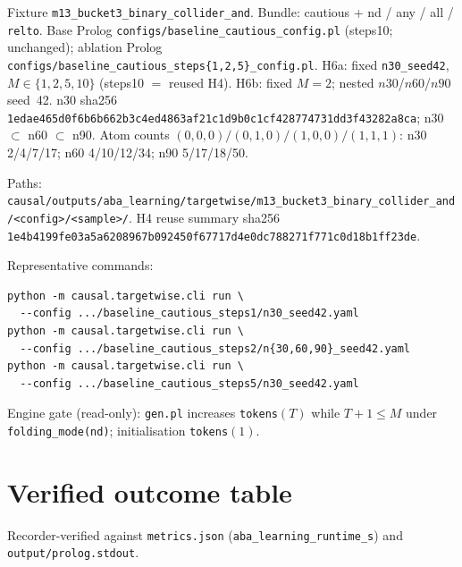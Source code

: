 \documentclass[11pt]{article}
\begin{document}
Fixture \texttt{m13\_bucket3\_binary\_collider\_and}.
Bundle: cautious + nd / any / all / \texttt{relto}.
Base Prolog \texttt{configs/baseline\_cautious\_config.pl} (steps10; unchanged);
ablation Prolog
\texttt{configs/baseline\_cautious\_steps\{1,2,5\}\_config.pl}.
H6a: fixed \texttt{n30\_seed42}, $M\in\{1,2,5,10\}$ (steps10 ${=}{}$ reused H4).
H6b: fixed $M{=}2$; nested $n30$/$n60$/$n90$ seed~42.
n30 sha256
\texttt{1edae465d0f6b6b662b3c4ed4863af21c1d9b0c1cf428774731dd3f43282a8ca};
n30 $\subset$ n60 $\subset$ n90.
Atom counts $(0,0,0)/(0,1,0)/(1,0,0)/(1,1,1)$:
n30 2/4/7/17; n60 4/10/12/34; n90 5/17/18/50.

Paths:
\texttt{causal/outputs/aba\_learning/targetwise/m13\_bucket3\_binary\_collider\_and/<config>/<sample>/}.
H4 reuse summary sha256
\texttt{1e4b4199fe03a5a6208967b092450f67717d4e0dc788271f771c0d18b1ff23de}.

Representative commands:
\begin{verbatim}
python -m causal.targetwise.cli run \
  --config .../baseline_cautious_steps1/n30_seed42.yaml
python -m causal.targetwise.cli run \
  --config .../baseline_cautious_steps2/n{30,60,90}_seed42.yaml
python -m causal.targetwise.cli run \
  --config .../baseline_cautious_steps5/n30_seed42.yaml
\end{verbatim}

Engine gate (read-only): \texttt{gen.pl} increases \texttt{tokens}$(T)$ while
$T{+}1\le M$ under \texttt{folding\_mode(nd)}; initialisation \texttt{tokens}$(1)$.

\section{Verified outcome table}

Recorder-verified against \texttt{metrics.json}
(\texttt{aba\_learning\_runtime\_s}) and \texttt{output/prolog.stdout}.
\end{document}
